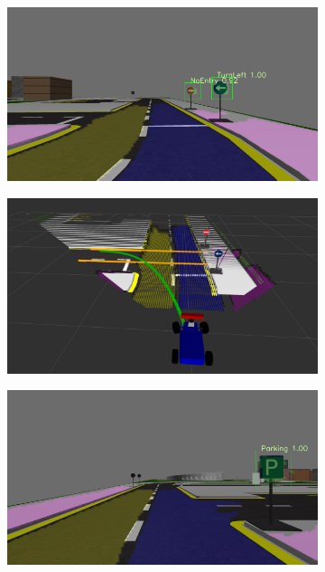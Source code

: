 \begin{figure}[h]
  \centering
  \begin{subfigure}[b]{0.45\linewidth}
    \includegraphics[width=\linewidth]{figures/experiments/turn-left-img.png}
  \end{subfigure}
  \begin{subfigure}[b]{0.45\linewidth}
    \includegraphics[width=\linewidth]{figures/experiments/turn-left-pc.png}
  \end{subfigure}
  \begin{subfigure}[b]{0.45\linewidth}
    \includegraphics[width=\linewidth]{figures/experiments/parking-img.png}

\end{subfigure}
\end{figure}

